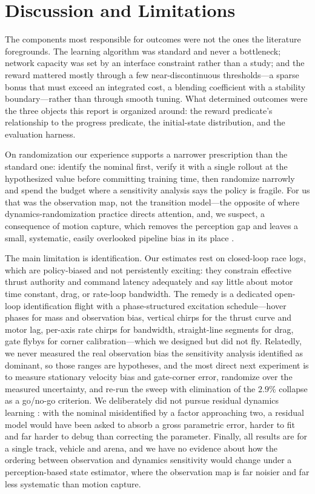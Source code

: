 \documentclass[10pt, twocolumn]{article}
\begin{document}
\section{Discussion and Limitations}

The components most responsible for outcomes were not the ones the literature
foregrounds. The learning algorithm was standard and never a bottleneck;
network capacity was set by an interface constraint rather than a study; and the
reward mattered mostly through a few near-discontinuous thresholds---a sparse
bonus that must exceed an integrated cost, a blending coefficient with a
stability boundary---rather than through smooth tuning. What determined outcomes
were the three objects this report is organized around: the reward predicate's
relationship to the progress predicate, the initial-state distribution, and the
evaluation harness.

On randomization our experience supports a narrower prescription than the
standard one: identify the nominal first, verify it with a single rollout at the
hypothesized value before committing training time, then randomize narrowly and
spend the budget where a sensitivity analysis says the policy is fragile. For
us that was the observation map, not the transition model---the opposite of
where dynamics-randomization practice \cite{tobin2017,peng2018} directs
attention, and, we suspect, a consequence of motion capture, which removes the
perception gap and leaves a small, systematic, easily overlooked pipeline bias
in its place \cite{kaufmann2023}.

The main limitation is identification. Our estimates rest on closed-loop race
logs, which are policy-biased and not persistently exciting: they constrain
effective thrust authority and command latency adequately and say little about
motor time constant, drag, or rate-loop bandwidth. The remedy is a dedicated
open-loop identification flight with a phase-structured excitation
schedule---hover phases for mass and observation bias, vertical chirps for the
thrust curve and motor lag, per-axis rate chirps for bandwidth, straight-line
segments for drag, gate flybys for corner calibration---which we designed but
did not fly. Relatedly, we never measured the real observation bias the
sensitivity analysis identified as dominant, so those ranges are hypotheses,
and the most direct next experiment is to measure stationary velocity bias and
gate-corner error, randomize over the measured uncertainty, and re-run the
sweep with elimination of the $2.9\%$ collapse as a go/no-go criterion. We
deliberately did not pursue residual dynamics learning \cite{kaufmann2023}:
with the nominal misidentified by a factor approaching two, a residual model
would have been asked to absorb a gross parametric error, harder to fit and far
harder to debug than correcting the parameter. Finally, all results are for a
single track, vehicle and arena, and we have no evidence about how the ordering
between observation and dynamics sensitivity would change under a
perception-based state estimator, where the observation map is far noisier and
far less systematic than motion capture.
\end{document}
